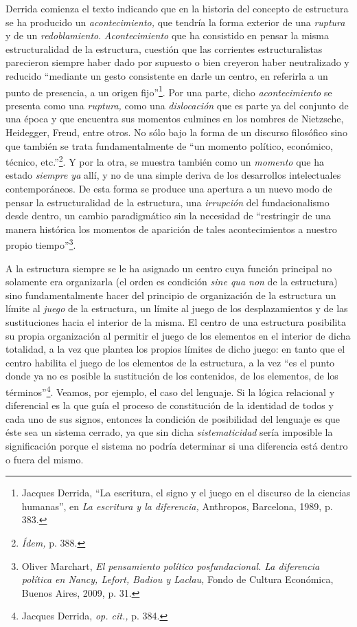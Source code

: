Derrida comienza el texto indicando que en la historia del concepto de estructura se ha producido un \emph{acontecimiento,} que tendría la forma exterior de una \emph{ruptura} y de un \emph{redoblamiento}. \emph{Acontecimiento} que ha consistido en pensar la misma estructuralidad de la estructura, cuestión que las corrientes estructuralistas parecieron siempre haber dado por supuesto o bien creyeron haber neutralizado y reducido \enquote{mediante un gesto consistente en darle un centro, en referirla a un punto de presencia, a un origen fijo}\footnote{Jacques Derrida, \enquote{La escritura, el signo y el juego en el discurso de la ciencias humanas}, en \emph{La escritura y la diferencia,} Anthropos, Barcelona, 1989, p. 383.}. Por una parte, dicho \emph{acontecimiento} se presenta como una \emph{ruptura,} como una \emph{dislocación} que es parte ya del conjunto de una época y que encuentra sus momentos culmines en los nombres de Nietzsche, Heidegger, Freud, entre otros. No sólo bajo la forma de un discurso filosófico sino que también se trata fundamentalmente de \enquote{un momento político, económico, técnico, etc.}\footnote{\emph{Ídem,} p. 388.}. Y por la otra, se muestra también como un \emph{momento} que ha estado \emph{siempre ya} allí, y no de una simple deriva de los desarrollos intelectuales contemporáneos. De esta forma se produce una apertura a un nuevo modo de pensar la estructuralidad de la estructura, una \emph{irrupción} del fundacionalismo desde dentro, un cambio paradigmático sin la necesidad de \enquote{restringir de una manera histórica los momentos de aparición de tales acontecimientos a nuestro propio tiempo}\footnote{Oliver Marchart, \emph{El pensamiento político posfundacional. La diferencia política en Nancy, Lefort, Badiou y Laclau,} Fondo de Cultura Económica, Buenos Aires, 2009, p. 31.}.

A la estructura siempre se le ha asignado un centro cuya función principal no solamente era organizarla (el orden es condición \emph{sine qua non} de la estructura) sino fundamentalmente hacer del principio de organización de la estructura un límite al \emph{juego} de la estructura, un límite al juego de los desplazamientos y de las sustituciones hacia el interior de la misma. El centro de una estructura posibilita su propia organización al permitir el juego de los elementos en el interior de dicha totalidad, a la vez que plantea los propios límites de dicho juego: en tanto que el centro habilita el juego de los elementos de la estructura, a la vez \enquote{es el punto donde ya no es posible la sustitución de los contenidos, de los elementos, de los términos}\footnote{Jacques Derrida, \emph{op. cit.,} p. 384.}. Veamos, por ejemplo, el caso del lenguaje. Si la lógica relacional y diferencial es la que guía el proceso de constitución de la identidad de todos y cada uno de sus signos, entonces la condición de posibilidad del lenguaje es que éste sea un sistema cerrado, ya que sin dicha \emph{sistematicidad} sería imposible la significación porque el sistema no podría determinar si una diferencia está dentro o fuera del mismo.


